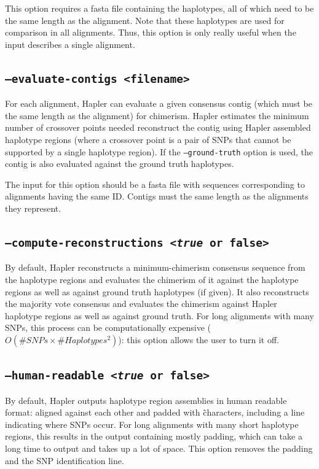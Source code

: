 \documentclass[11pt]{llncs}
\begin{document}
This option requires a fasta file containing the haplotypes, all of which need to be the same length as the alignment. Note that these haplotypes
are used for comparison in all alignments. Thus, this option is only really useful when the input describes a single alignment.

\subsection{\texttt{--evaluate-contigs <filename>}}

For each alignment, Hapler can evaluate a given consensus contig (which must be the same length as the alignment) for chimerism. Hapler
estimates the minimum number of crossover points needed reconstruct the contig using Hapler assembled haplotype regions (where a crossover
point is a pair of SNPs that cannot be supported by a single haplotype region). If the \texttt{--ground-truth} option is used, the contig is 
also evaluated against the ground truth haplotypes. 

The input for this option should be a fasta file with sequences corresponding to alignments having the same ID. Contigs must the same length
as the alignments they represent.

\subsection{\texttt{--compute-reconstructions <\emph{true} or false>}}

By default, Hapler reconstructs a minimum-chimerism consensus sequence from the haplotype regions and evaluates the chimerism of it against the
haplotype regions as well as against ground truth haplotypes (if given). It also reconstructs the majority vote consensus and evaluates the chimerism
against Hapler haplotype regions as well as against ground truth. For long alignments with many SNPs, this process can be computationally expensive 
($O(\#SNPs \times \#Haplotypes^2)$): this option allows the user to turn it off.

\subsection{\texttt{--human-readable <\emph{true} or false>}}

By default, Hapler outputs haplotype region assemblies in human readable format: aligned against each other and padded with \~ characters, including a line
indicating where SNPs occur. For long alignments with many short haplotype regions, this results in the output containing mostly padding, which can take
a long time to output and takes up a lot of space. This option removes the padding and the SNP identification line.
\end{document}
